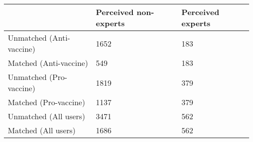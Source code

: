 \begin{table}[ht]
\centering
\begin{tabular}{lll}
  \hline
  & Perceived non-experts & Perceived experts \\ 
  \hline
Unmatched (Anti-vaccine) & 1652 & 183 \\ 
  Matched (Anti-vaccine) & 549 & 183 \\ 
  Unmatched (Pro-vaccine) & 1819 & 379 \\ 
  Matched (Pro-vaccine) & 1137 & 379 \\ 
  Unmatched (All users) & 3471 & 562 \\ 
  Matched (All users) & 1686 & 562 \\ 
   \hline
\end{tabular}
\end{table}
